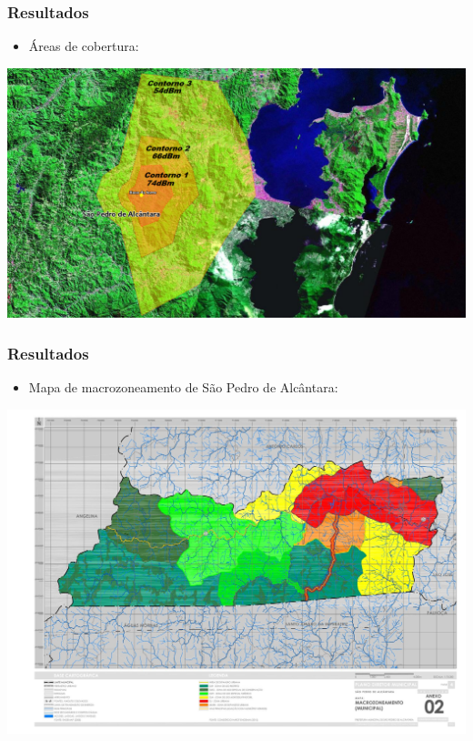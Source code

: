 \documentclass{beamer}
\begin{document}
    
          \begin{frame}
    
      \frametitle{Resultados}
      
      \begin{itemize}

      \item Áreas de cobertura:

      \end{itemize}
      
      \begin{center}
      
           \includegraphics[width=.8\linewidth]{figs/todososcontornos.png}	
           
        \end{center}
      
  \end{frame}
  
  \begin{frame}
    
      \frametitle{Resultados}
      
       \begin{itemize}
      
      \item Mapa de macrozoneamento de São Pedro de Alcântara: 
      
       \end{itemize}
       
      \begin{center}
      
           \includegraphics[width=.9\linewidth]{figs/1757_MAPA_MACROZONEAMENTO.jpg}	
           
        \end{center}
      
  \end{frame}
  
\end{document}
